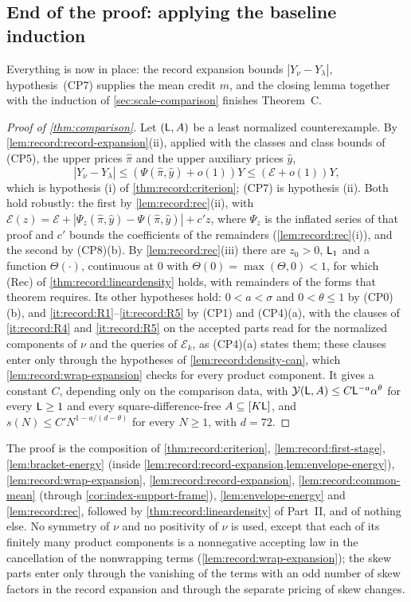 \subsection{End of the proof: applying the baseline induction}\label{subsec:cp:proof}

Everything is now in place: the record expansion bounds
$|Y_\nu-Y_\lambda|$, hypothesis~(CP7) supplies the mean credit $m$,
and the closing lemma together with the induction of
\cref{sec:scale-comparison} finishes Theorem~C.

\begin{proof}[Proof of \cref{thm:comparison}]
Let $(\mathsf L,A)$ be a least normalized counterexample. By
\cref{lem:record:record-expansion}(ii), applied with the classes and class
bounds of (CP5), the upper prices $\hat\pi$ and the upper auxiliary prices
$\hat y$,
\[
 |Y_\nu-Y_\lambda|\le(\Psi(\hat\pi,\hat y)+o(1))Y\le(\mathcal E+o(1))Y,
\]
which is hypothesis (i) of \cref{thm:record:criterion}; (CP7) is hypothesis
(ii). Both hold robustly: the first by \cref{lem:record:rec}(ii), with
$\mathcal E(z)=\mathcal E+|\Psi_z(\hat\pi,\hat y)-\Psi(\hat\pi,\hat y)|+c'z$,
where $\Psi_z$ is the inflated series of that proof and $c'$ bounds the
coefficients of the remainders (\cref{lem:record:rec}(i)), and the second by
(CP8)(b). By \cref{lem:record:rec}(iii) there are $z_0>0$, $\mathsf L_1$ and a
function $\Theta(\cdot)$, continuous at $0$ with
$\Theta(0)=\max(\Theta,0)<1$, for which (Rec) of
\cref{thm:record:lineardensity} holds, with remainders of the forms that
theorem requires. Its other hypotheses hold: $0<a<\sigma$ and
$0<\theta\le1$ by (CP0)(b), and \ref{it:record:R1}--\ref{it:record:R5} by
(CP1) and (CP4)(a), with the clauses of \ref{it:record:R4} and
\ref{it:record:R5} on the accepted parts read for the normalized components
of $\nu$ and the queries of $\mathcal E_k$, as (CP4)(a) states them; these
clauses enter only through the hypotheses of \cref{lem:record:density-can},
which \cref{lem:record:wrap-expansion} checks for every product
component. It gives a constant $C$, depending only on the
comparison data, with
$\mathcal Y(\mathsf L,A)\le C\mathsf L^{-a}\alpha^\theta$ for every $\mathsf L\ge1$ and every
square-difference-free $A\subseteq[K\mathsf L]$, and
$s(N)\le C'N^{1-a/(d-\theta)}$ for every $N\ge1$, with $d=72$.
\end{proof}

The proof is the composition of \cref{thm:record:criterion},
\cref{lem:record:first-stage}, \cref{lem:bracket-energy} (inside
\cref{lem:record:record-expansion,lem:envelope-energy}),
\cref{lem:record:wrap-expansion}, \cref{lem:record:record-expansion},
\cref{lem:record:common-mean} (through \cref{cor:index-support-frame}),
\cref{lem:envelope-energy} and \cref{lem:record:rec}, followed by
\cref{thm:record:lineardensity} of Part~II, and of nothing else. No symmetry
of $\nu$ and no positivity of $\nu$ is used, except that each of its finitely
many product components is a nonnegative accepting law in the cancellation of
the nonwrapping terms (\cref{lem:record:wrap-expansion}); the skew parts enter
only through the vanishing of the terms with an odd number of skew factors in the record expansion and through
the separate pricing of skew changes.

